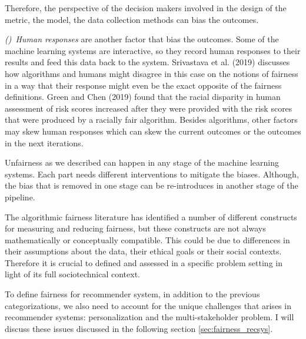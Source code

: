        Therefore, the perspective of the decision makers involved in the design of the metric, the model, the data collection methods can bias the outcomes.
        
        \textit{()~Human responses} are another factor that bias the outcomes. Some of the machine learning systems are interactive, so they record human responses to their results and feed this data back to the system. Srivastava et al. (2019) \cite{Srivastava2019fairnessnotions} discusses how algorithms and humans might disagree in this case on the notions of fairness in a way that their response might even be the exact opposite of the fairness definitions. Green and Chen (2019) \cite{Green2019algointheloop} found that the racial disparity in human assessment of risk scores increased after they were provided with the risk scores that were produced by a racially fair algorithm. Besides algorithms, other factors may skew human responses which can skew the current outcomes or the outcomes in the next iterations.
        
        Unfairness as we described can happen in any stage of the machine learning systems. Each part needs different interventions to mitigate the biases. Although, the bias that is removed in one stage can be re-introduces in another stage of the pipeline.
        
    
    
    The algorithmic fairness literature has identified a number of different constructs for measuring and reducing fairness, but these constructs are not always mathematically or conceptually compatible. This could be due to differences in their assumptions about the data, their ethical goals or their social contexts. Therefore it is crucial to defined and assessed in a specific problem setting in light of its full sociotechnical context.

    To define fairness for recommender system, in addition to the previous categorizations, we also need to account for the unique challenges that arises in recommender systems: personalization and the multi-stakeholder problem. I will discuss these issues discussed in the following section \ref{sec:fairness_recsys}.

